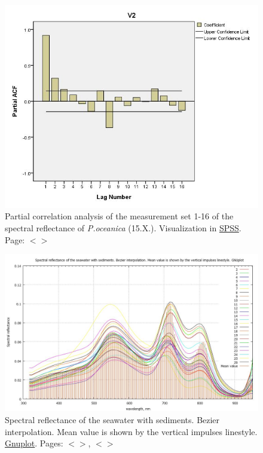 \documentclass[11pt]{article}
\begin{document}
\begin{appendices}
\begin{figure}[H]
	\centering
	\includegraphics[scale=0.45]{Partial_Corr.jpg}
	\caption{Partial correlation analysis of the measurement set 1-16 of the spectral reflectance of \textit{P.oceanica} (15.X.). Visualization in \href{http://www.spss.com/}{SPSS}. Page: $<$\pageref{A-24}$>$}
	\label{fig:A.22}
\end{figure}
\pagebreak

\begin{figure}[H]
	\begin{center}
		\includegraphics[scale=0.25]{GNU-09.jpg}
		\caption{Spectral reflectance of the seawater with sediments. Bezier interpolation. Mean value is shown by the vertical impulses linestyle. \href{http://www.gnuplot.info/}{Gnuplot}. Pages: $<$\pageref{dataprep}$>$­, $<$\pageref{page-31}$>$}
		\label{fig:A.23}
	\end{center}
\end{figure}


\end{appendices}
\end{document}
